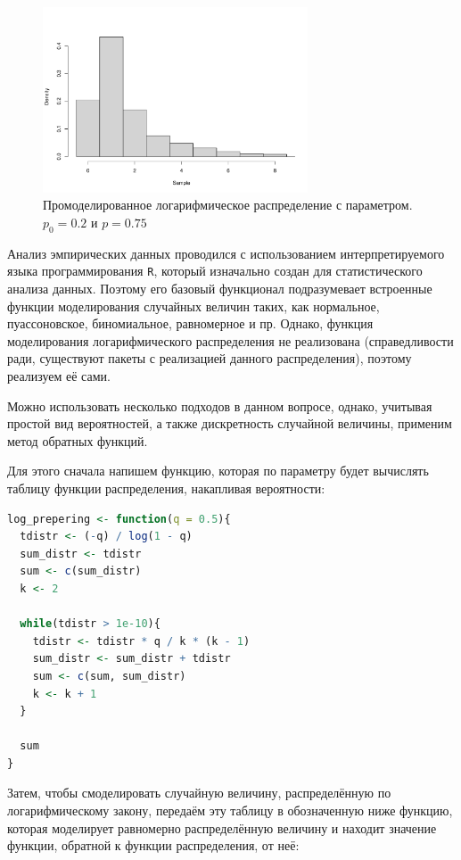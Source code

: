 \documentclass[12pt, specialist, subf, substylefile = spbu_report.rtx]{disser}
\begin{document}
	\begin{figure}[ht]
		\centering
		\includegraphics[width = 0.7\textwidth]{logdistr}
		\caption{Промоделированное логарифмическое распределение с параметром. $ p _0 = 0.2 $ и $ p = 0.75 $}
		\label{img:logdist}
	\end{figure}
	
	Анализ эмпирических данных проводился с использованием интерпретируемого языка программирования \verb|R|, который изначально создан для статистического анализа данных. Поэтому его базовый функционал подразумевает встроенные функции моделирования случайных величин таких, как нормальное, пуассоновское, биномиальное, равномерное и пр. Однако, функция моделирования логарифмического распределения не реализована (справедливости ради, существуют пакеты с реализацией данного распределения), поэтому реализуем её сами.
	
	Можно использовать несколько подходов в данном вопросе, однако, учитывая простой вид вероятностей, а также дискретность случайной величины, применим метод обратных функций.
	
	Для этого сначала напишем функцию, которая по параметру будет вычислять таблицу функции распределения, накапливая вероятности:  
	
	\begin{lstlisting}[language=R]
log_prepering <- function(q = 0.5){
  tdistr <- (-q) / log(1 - q)
  sum_distr <- tdistr
  sum <- c(sum_distr)
  k <- 2
	
  while(tdistr > 1e-10){
    tdistr <- tdistr * q / k * (k - 1)
    sum_distr <- sum_distr + tdistr
    sum <- c(sum, sum_distr)
    k <- k + 1
  }
	
  sum
}
	\end{lstlisting}
	
	Затем, чтобы смоделировать случайную величину, распределённую по логарифмическому закону, передаём эту таблицу в обозначенную ниже функцию, которая моделирует равномерно распределённую величину и находит значение функции, обратной к функции распределения, от неё:
	
\end{document}
